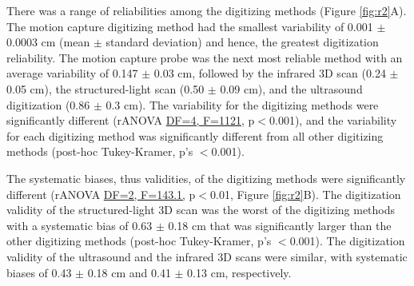 \documentclass[../thesis_seyed.tex]{subfiles}
\begin{document}
There was a range of reliabilities among the digitizing methods (Figure \ref{fig:r2}A). The motion capture digitizing method had the smallest variability of 0.001 $\pm$ 0.0003 cm (mean $\pm$ standard deviation) and hence, the greatest digitization reliability. The motion capture probe was the next most reliable method with an average variability of 0.147 $\pm$ 0.03 cm, followed by the infrared 3D scan (0.24 $\pm$ 0.05 cm), the structured-light scan (0.50 $\pm$ 0.09 cm), and the ultrasound digitization (0.86 $\pm$ 0.3 cm). The variability for the digitizing methods were significantly different (rANOVA \ul{DF=4, F=1121,} p$<$0.001), and the variability for each digitizing method was significantly different from all other digitizing methods (post-hoc Tukey-Kramer, p's $<$0.001). 

The systematic biases, thus validities, of the digitizing methods were significantly different (rANOVA \ul{DF=2, F=143.1,} p$<$0.01, Figure \ref{fig:r2}B). The digitization validity of the structured-light 3D scan was the worst of the digitizing methods with a systematic bias of 0.63 $\pm$ 0.18 cm that was significantly larger than the other digitizing methods (post-hoc Tukey-Kramer, p's $<$0.001). The digitization validity of the ultrasound and the infrared 3D scans were similar, with systematic biases of 0.43 $\pm$ 0.18 cm and 0.41 $\pm$ 0.13 cm, respectively.
\end{document}
